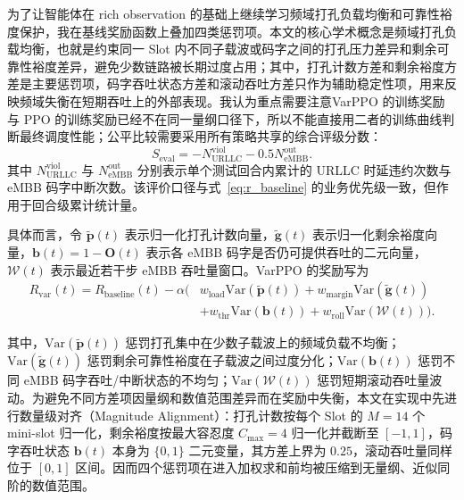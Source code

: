 为了让智能体在 rich observation 的基础上继续学习频域打孔负载均衡和可靠性裕度保护，我在基线奖励函数上叠加四类惩罚项。本文的核心学术概念是频域打孔负载均衡，也就是约束同一 Slot 内不同子载波或码字之间的打孔压力差异和剩余可靠性裕度差异，避免少数链路被长期过度占用；其中，打孔计数方差和剩余裕度方差是主要惩罚项，码字吞吐状态方差和滚动吞吐方差只作为辅助稳定性项，用来反映频域失衡在短期吞吐上的外部表现。我认为重点需要注意VarPPO 的训练奖励与 PPO 的训练奖励已经不在同一量纲口径下，所以不能直接用二者的训练曲线判断最终调度性能；公平比较需要采用所有策略共享的综合评级分数：
\begin{equation}
  S_{\text{eval}}
  =
  -N_{\text{URLLC}}^{\text{viol}}
  -0.5N_{\text{eMBB}}^{\text{out}}.
  \label{eq:s_eval}
\end{equation}
其中 \(N_{\text{URLLC}}^{\text{viol}}\) 与 \(N_{\text{eMBB}}^{\text{out}}\) 分别表示单个测试回合内累计的 URLLC 时延违约次数与 eMBB 码字中断次数。该评价口径与式~\eqref{eq:r_baseline} 的业务优先级一致，但作用于回合级累计统计量。

具体而言，令 \(\tilde{\mathbf{p}}(t)\) 表示归一化打孔计数向量，\(\tilde{\mathbf{g}}(t)\) 表示归一化剩余裕度向量，\(\mathbf{b}(t)=1-\mathbf{O}(t)\) 表示各 eMBB 码字是否仍可提供吞吐的二元向量，\(\mathcal{W}(t)\) 表示最近若干步 eMBB 吞吐量窗口。VarPPO 的奖励写为
\begin{equation}
\begin{aligned}
  R_{\text{var}}(t)
  = R_{\text{baseline}}(t)
  - \alpha \Big(
      &w_{\text{load}}\mathrm{Var}(\tilde{\mathbf{p}}(t))
      + w_{\text{margin}}\mathrm{Var}(\tilde{\mathbf{g}}(t))\\
      &+ w_{\text{thr}}\mathrm{Var}(\mathbf{b}(t))
      + w_{\text{roll}}\mathrm{Var}(\mathcal{W}(t))
    \Big).
\end{aligned}
  \label{eq:r_var}
\end{equation}

其中，\(\mathrm{Var}(\tilde{\mathbf{p}}(t))\) 惩罚打孔集中在少数子载波上的频域负载不均衡；\(\mathrm{Var}(\tilde{\mathbf{g}}(t))\) 惩罚剩余可靠性裕度在子载波之间过度分化；\(\mathrm{Var}(\mathbf{b}(t))\) 惩罚不同 eMBB 码字吞吐/中断状态的不均匀；\(\mathrm{Var}(\mathcal{W}(t))\) 惩罚短期滚动吞吐量波动。为避免不同方差项因量纲和数值范围差异而在奖励中失衡，本文在实现中先进行数量级对齐（Magnitude Alignment）：打孔计数按每个 Slot 的 \(M=14\) 个 mini-slot 归一化，剩余裕度按最大容忍度 \(C_{\max}=4\) 归一化并截断至 \([-1,1]\)，码字吞吐状态 \(\mathbf{b}(t)\) 本身为 \(\{0,1\}\) 二元变量，其方差上界为 \(0.25\)，滚动吞吐量同样位于 \([0,1]\) 区间。因而四个惩罚项在进入加权求和前均被压缩到无量纲、近似同阶的数值范围。


